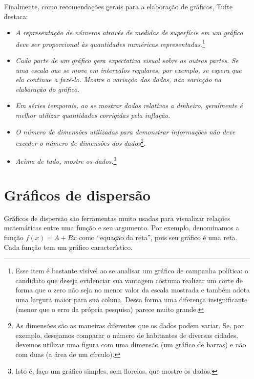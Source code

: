 Finalmente, como recomendações gerais para a elaboração de gráficos, Tufte destaca:
\begin{itemize}
	\item \emph{A representação de números através de medidas de superfície em um gráfico deve ser proporcional às quantidades numéricas representadas}.\footnote[][-3cm]{Esse item é bastante visível ao se analisar um gráfico de campanha política: o candidato que deseja evidenciar sua vantagem costuma realizar um corte de forma que o zero não seja no menor valor da escala mostrada e também adota uma largura maior para sua coluna. Dessa forma uma diferença insignificante (menor que o erro da própria pesquisa) parece muito grande.}
	\item \emph{Cada parte de um gráfico gera expectativa visual sobre as outras partes. Se uma escala que se move em intervalos regulares, por exemplo, se espera que ela continue a fazê-lo. Mostre a variação dos dados, não variação na elaboração do gráfico.}
	\item \emph{Em séries temporais, ao se mostrar dados relativos a dinheiro, geralmente é melhor utilizar quantidades corrigidas pela inflação}.
	\item \emph{O número de dimensões utilizadas para demonstrar informações não deve exceder o número de dimensões dos dados}\footnote{As dimensões são as maneiras diferentes que os dados podem variar. Se, por exemplo, desejamos comparar o número de habitantes de diversas cidades, devemos utilizar uma figura com uma dimensão (um gráfico de barras) e não com duas (a área de um círculo).}.
	\item \emph{Acima de tudo, mostre os dados.}\footnote{Isto é, faça um gráfico simples, sem floreios, que mostre os dados.}
\end{itemize}


\section{Gráficos de dispersão}

Gráficos de dispersão são ferramentas muito usadas para visualizar relações matemáticas entre uma função e seu argumento. Por exemplo, denominamos a função $f(x) = A + Bx$ como ``equação da reta'', pois seu gráfico é uma reta. Cada função tem um gráfico característico. 

